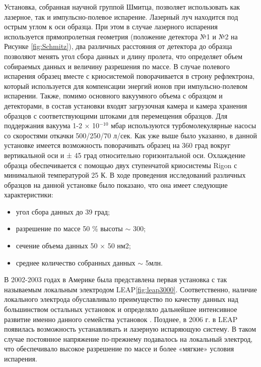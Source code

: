 Установка, собранная научной группой Шмитца, позволяет использовать как лазерное, так и импульсно-полевое испарение. Лазерный луч находится под острым углом к оси образца. При этом в случае лазерного испарения используется прямопролетная геометрия (положение детектора №1 и №2 на Рисунке \cref{fig:Schmitz}), два различных расстояния от детектора до образца позволяют менять угол сбора данных и длину пролета, что определяет объем собираемых данных и величину разрешения по массе. В случае полевого испарения образец вместе с криосистемой поворачивается в строну рефлектрона, который используется для компенсации энергий ионов при импульсно-полевом испарении. Также, помимо основного вакуумного объема с образцом и детекторами, в состав установки входят загрузочная камера и камера хранения образцов с соответствующими штоками для перемещения образцов. Для поддержания вакуума 1-2 × 10$^{-10}$ мбар используются турбомолекулярные насосы со скоростями откачки 500/250/70 л/сек. Как уже выше было указанно, в данной установке имеется возможность поворачивать образец на 360 град вокруг вертикальной оси и ± 45 град относительно горизонтальной оси. Охлаждение образца обеспечивается с помощью двух ступенчатой криосистемы Rigon с минимальной температурой 25 К. В ходе проведения исследований различных образцов на данной установке было показано, что она имеет следующие характеристики:
\begin{itemize}[beginpenalty=10000] %
	\item угол сбора данных до 39 град;
	\item разрешение по массе 50 \% высоты $\sim$ 300;
	\item сечение объема данных 50 × 50 нм2;
	\item среднее количество собранных данных $\sim$ 5млн.
\end{itemize}	

В 2002-2003 годах в Америке была представлена первая установка с так называемым локальным электродом LEAP\cref{fig:leap3000}.  Соответственно, наличие локального электрода обуславливало преимущество по качеству данных над большинством остальных установок и определяло дальнейшее интенсивное развитие именно данного семейства установок \cite{Kelly00}. Позднее, в 2006 г. в LEAP появилась возможность устанавливать и лазерную испаряющую систему. В таком случае постоянное напряжение по-прежнему подавалось на локальный электрод, что обеспечивало высокое разрешение по массе и более «мягкие» условия испарения.


